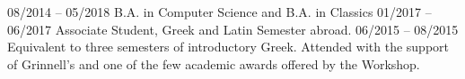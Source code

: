 
\begin{entrylist}
	\entry
		{08/2014 -- 05/2018}
   		{B.A. in Computer Science and B.A. in Classics}
		{\grinnell}
		{}
	\entry
		{01/2017 -- 06/2017}
    		{Associate Student, Greek and Latin}
    		{\ucl}
    		{Semester abroad.}
	\entry
		{06/2015 -- 08/2015}
    		{}
    		{\berkeley}
   		{Equivalent to three semesters of introductory Greek. Attended with the support of Grinnell's  and one of the few academic awards offered by the Workshop.}
\end{entrylist}